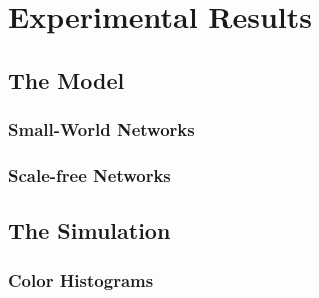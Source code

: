 
\chapter{Experimental Results} %

\label{Chapter4} %



\section{The Model}



\subsection{Small-World Networks}



\subsection{Scale-free Networks}



\section{The Simulation}

\subsection{Color Histograms}


